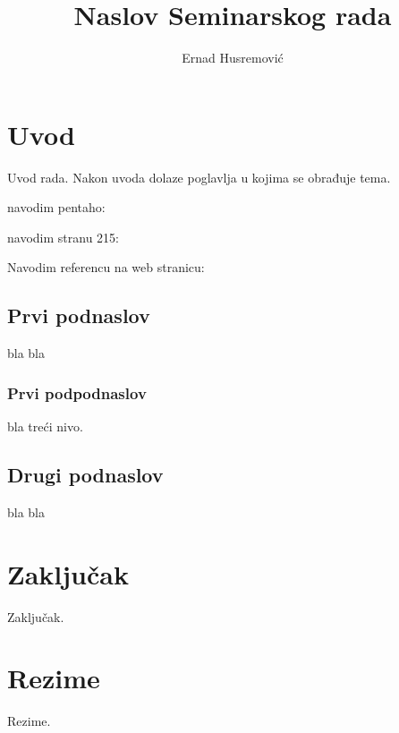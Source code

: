 \documentclass[times, utf8, seminar]{fit}
\begin{document}
\title{Naslov Seminarskog rada}

\author{Ernad Husremović}


\maketitle

\tableofcontents

\chapter{Uvod}
Uvod rada. Nakon uvoda dolaze poglavlja u kojima se obrađuje tema.

navodim pentaho: \cite{pentaho32}

navodim stranu 215: \cite[str.~215]{pentaho32}

Navodim referencu na web stranicu: \citep{website:fermentas-lambda}

\section{Prvi podnaslov}

bla bla

\subsection{Prvi podpodnaslov}

bla treći nivo.

\section{Drugi podnaslov}

bla bla



\chapter{Zaključak}
Zaključak.




\chapter{Rezime}
Rezime.

\appendix
\end{document}
